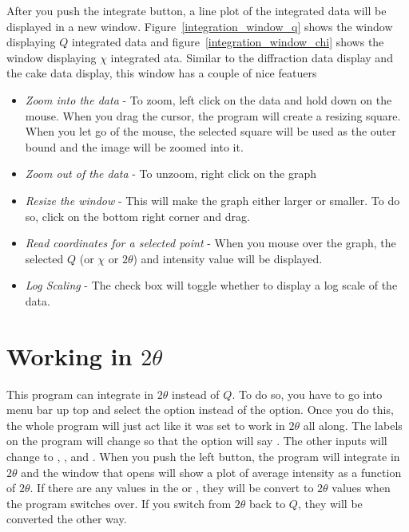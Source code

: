 After you push the integrate button, a line plot of the 
integrated data will be displayed in a new window. 
Figure~\ref{integration_window_q} shows 
the window displaying $Q$ integrated data
and figure~\ref{integration_window_chi} shows the
window displaying $\chi$ integrated ata.
Similar to the diffraction data display and the cake 
data display, this window has a couple of nice featuers
\begin{itemize}
    \item {\em Zoom into the data} - To zoom, left click
    on the data and hold down on the mouse. When you drag 
    the cursor, the program will create a resizing square. 
    When you let go of the mouse, the selected square will 
    be used as the outer bound and the image will be zoomed 
    into it. 
    \item {\em Zoom out of the data} - To unzoom, right
    click on the graph
    \item {\em Resize the window} - This will make the graph
    either larger or smaller. To do so, click on the bottom 
    right corner and drag. 
    \item {\em Read coordinates for a selected point} -
    When you mouse over the graph, the selected $Q$ (or $\chi$
    or $2\theta$) and intensity value will be displayed.
    \item {\em Log Scaling} - The  check box
    will toggle whether to display a log scale of the data.
\end{itemize}

\section{\texorpdfstring{Working in $2\theta$}{Working in 2theta}}

This program can integrate in $2\theta$ instead of $Q$. To 
do so, you have to go into menu bar up top and select
the  option instead of the
 option. Once you do this, the whole program
will just act like it was set to work in $2\theta$ all
along. The labels
on the program will change so that the option will say
. The other inputs will change
to , , and
. When you push the left
 button, the program will integrate 
in $2\theta$ and the window that opens will show a plot
of average intensity as a function of $2\theta$.
If there are any values in the  or
, they will be convert to $2\theta$
values when the program switches over. If you switch
from $2\theta$ back to $Q$, they will be converted
the other way.

